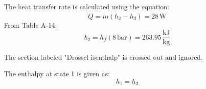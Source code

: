 The heat transfer rate is calculated using the equation:  
\[
\dot{Q} = \dot{m} (h_2 - h_3) = 28 \, \text{W}
\]  
From Table A-14:  
\[
h_2 = h_f(8 \, \text{bar}) = 263.95 \, \frac{\text{kJ}}{\text{kg}}
\]  

The section labeled "Drossel isenthalp" is crossed out and ignored.  

The enthalpy at state 1 is given as:  
\[
h_1 = h_2
\]